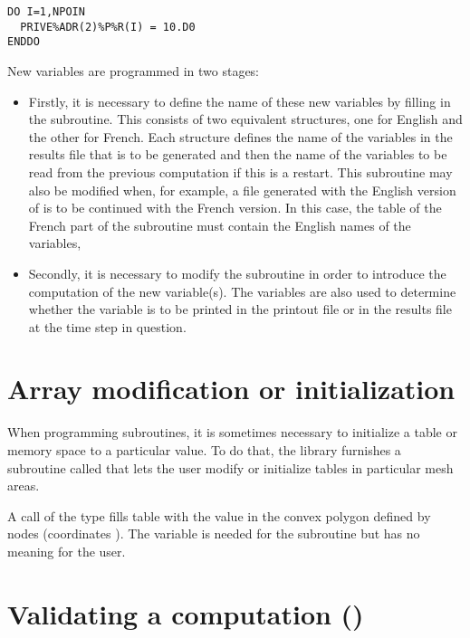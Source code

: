 \begin{lstlisting}[language=TelFortran]
DO I=1,NPOIN
  PRIVE%ADR(2)%P%R(I) = 10.D0
ENDDO
\end{lstlisting}

New variables are programmed in two stages:

\begin{itemize}
\item Firstly, it is necessary to define the name of these new variables
by filling in the  subroutine.
This consists of two equivalent structures, one for English and the other
for French.
Each structure defines the name of the variables in the results file
that is to be generated and then the name of the variables to be read
from the previous computation if this is a restart.
This subroutine may also be modified when, for example, a file generated with
the English version of  is to be continued with the French version.
In this case, the  table of the French part of the subroutine
must contain the English names of the variables,

\item Secondly, it is necessary to modify the 
subroutine in order to introduce the computation of the new variable(s).
The variables  are also used to
determine whether the variable is to be printed in the printout file
or in the results file at the time step in question.
\end{itemize}


\section{Array modification or initialization}

When programming  subroutines, it is sometimes necessary to
initialize a table or memory space to a particular value.
To do that, the \bief library furnishes a subroutine called 
that lets the user modify or initialize tables in particular mesh areas.

A call of the type 
fills table  with the  value in the convex polygon
defined by  nodes (coordinates ).
The variable  is needed for the  subroutine
but has no meaning for the user.


\section{Validating a computation ()}

